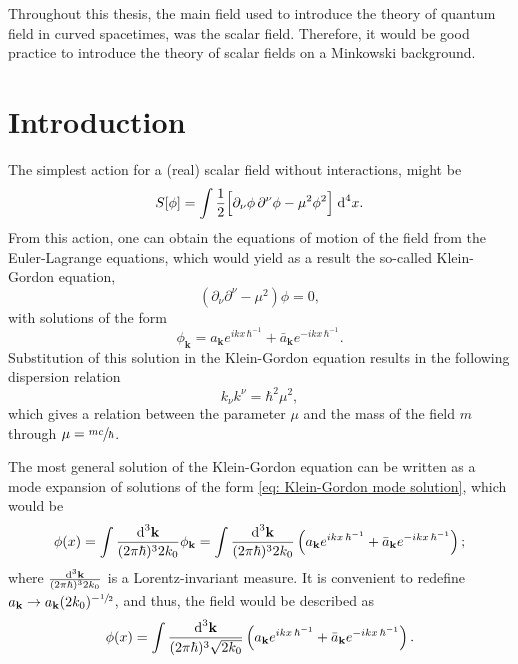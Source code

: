 Throughout this thesis, the main field used to introduce the theory of quantum field in curved spacetimes, was the scalar field. Therefore, it would be good practice to introduce the theory of scalar fields on a Minkowski background.
\vspace{0.25cm}
\section*{Introduction}
The simplest action for a (real) scalar field without interactions, might be 
\begin{equation}\label{eq: Minkowski scalar action}
	S[\phi]=\int\frac{1}{2}\Big[\partial_\nu\phi\,\partial^\nu\phi-\mu^2\phi^2\Big]\;\text{d}^4 x.
\end{equation}
From this action, one can obtain the equations of motion of the field from the Euler-Lagrange equations, which would yield as a result the so-called Klein-Gordon equation,
\begin{equation}
	\left(\partial_\nu\partial^\nu-\mu^2\right)\phi=0,
\end{equation}
with solutions of the form
\begin{equation}\label{eq: Klein-Gordon mode solution}
	\phi_\mathbf{k}=a_\mathbf{k}e^{ikx\,\hbar^{-1}}+\bar a_\mathbf{k}e^{-ikx\,\hbar^{-1}}.
\end{equation}
Substitution of this solution in the Klein-Gordon equation results in the following dispersion relation
\begin{equation}
	k_\nu k^\nu=\hbar^2\mu^2,
\end{equation}
which gives a relation between the parameter $\mu$ and the mass of the field $m$ through $\mu=\sfrac{mc}{\hbar}$.

The most general solution of the Klein-Gordon equation can be written as a mode expansion of solutions of the form \ref{eq: Klein-Gordon mode solution}, which would be
\begin{equation}
	\phi(x)=\int\frac{\text{d}^3\mathbf{k}}{(2\pi\hbar)^32k_0}\phi_{\mathbf{k}}=\int\frac{\text{d}^3\mathbf{k}}{(2\pi\hbar)^32k_0}\left(a_\mathbf{k}e^{ikx\,\hbar^{-1}}+\bar a_\mathbf{k}e^{-ikx\,\hbar^{-1}}\right);
\end{equation}
where $\frac{\text{d}^3\mathbf{k}}{(2\pi\hbar)^32k_0}$ is a Lorentz-invariant measure. It is convenient to redefine $a_\mathbf{k}\to a_\mathbf{k}(2k_0)^{-\sfrac{1}{2}}$, and thus, the field would be described as
\begin{equation}
	\phi(x)=\int\frac{\text{d}^3\mathbf{k}}{(2\pi\hbar)^3\sqrt{2k_0}}\left(a_\mathbf{k}e^{ikx\,\hbar^{-1}}+\bar a_\mathbf{k}e^{-ikx\,\hbar^{-1}}\right).
\end{equation}
